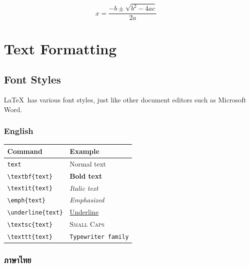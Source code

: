         \begin{equation}
            x = \frac{-b \pm \sqrt{b^2 - 4ac}}{2a}
            \label{eq:quadratic}
        \end{equation}

    \section{Text Formatting}
        \subsection{Font Styles}
            \LaTeX\ has various font styles, just like other document editors such as Microsoft Word.

            \subsubsection{English}

                \begin{table}[h]
                    \centering
                    \setlength{\extrarowheight}{2pt}
                    \begin{tabular}{ll}
                        \toprule
                        \textbf{Command} & \textbf{Example} \\
                        \midrule
                        \texttt{text} & Normal text \\
                        \texttt{\textbackslash textbf\{text\}} & \textbf{Bold text} \\
                        \texttt{\textbackslash textit\{text\}} & \textit{Italic text} \\
                        \texttt{\textbackslash emph\{text\}} & \emph{Emphasized} \\
                        \texttt{\textbackslash underline\{text\}} & \underline{Underline} \\
                        \texttt{\textbackslash textsc\{text\}} & \textsc{Small Caps} \\
                        \texttt{\textbackslash texttt\{text\}} & \texttt{Typewriter family} \\
                        \bottomrule
                    \end{tabular}
                \end{table}

            \subsubsection{ภาษาไทย}

